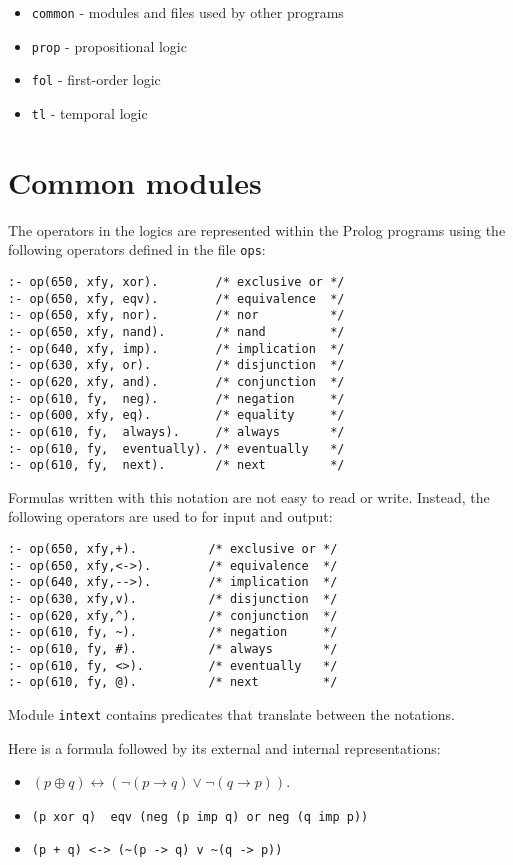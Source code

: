 \documentclass[11pt]{article}
\newcommand*{\p}[1]{\textup{\texttt{#1}}}
\begin{document}
\begin{itemize}
\item \p{common} - modules and files used by other programs
\item \p{prop}   - propositional logic
\item \p{fol}    - first-order logic
\item \p{tl}     - temporal logic
\end{itemize}



\section{Common modules}\label{s.common}

The operators in the logics are represented within the Prolog programs
using the following operators defined in the file \p{ops}:

\begin{verbatim}
:- op(650, xfy, xor).        /* exclusive or */
:- op(650, xfy, eqv).        /* equivalence  */
:- op(650, xfy, nor).        /* nor          */
:- op(650, xfy, nand).       /* nand         */
:- op(640, xfy, imp).        /* implication  */
:- op(630, xfy, or).         /* disjunction  */
:- op(620, xfy, and).        /* conjunction  */
:- op(610, fy,  neg).        /* negation     */
:- op(600, xfy, eq).         /* equality     */
:- op(610, fy,  always).     /* always       */
:- op(610, fy,  eventually). /* eventually   */
:- op(610, fy,  next).       /* next         */
\end{verbatim}

Formulas written with this notation are not easy to read or write.
Instead, the following operators are used to for input and output:

\begin{verbatim}
:- op(650, xfy,+).          /* exclusive or */
:- op(650, xfy,<->).        /* equivalence  */
:- op(640, xfy,-->).        /* implication  */
:- op(630, xfy,v).          /* disjunction  */
:- op(620, xfy,^).          /* conjunction  */
:- op(610, fy, ~).          /* negation     */
:- op(610, fy, #).          /* always       */
:- op(610, fy, <>).         /* eventually   */
:- op(610, fy, @).          /* next         */
\end{verbatim}

Module \p{intext} contains predicates that translate between the
notations.

Here is a formula followed by its external and internal representations:
\begin{itemize}
\item $(p \oplus q)  \leftrightarrow (\neg (p \rightarrow q) \vee \neg (q\rightarrow p) )$.
\item \verb+(p xor q)  eqv (neg (p imp q) or neg (q imp p))+
\item \verb=(p + q) <-> (~(p -> q) v ~(q -> p))=
\end{itemize}
\end{document}
